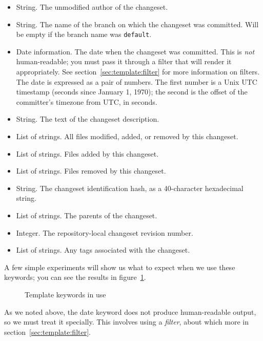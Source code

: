 \begin{itemize}
\item[\tplkword{author}] String.  The unmodified author of the changeset.
\item[\tplkword{branches}] String.  The name of the branch on which
  the changeset was committed.  Will be empty if the branch name was
  \texttt{default}.
\item[\tplkword{date}] Date information.  The date when the changeset
  was committed.  This is \emph{not} human-readable; you must pass it
  through a filter that will render it appropriately.  See
  section~\ref{sec:template:filter} for more information on filters.
  The date is expressed as a pair of numbers.  The first number is a
  Unix UTC timestamp (seconds since January 1, 1970); the second is
  the offset of the committer's timezone from UTC, in seconds.
\item[\tplkword{desc}] String.  The text of the changeset description.
\item[\tplkword{files}] List of strings.  All files modified, added, or
  removed by this changeset.
\item[\tplkword{file\_adds}] List of strings.  Files added by this
  changeset.
\item[\tplkword{file\_dels}] List of strings.  Files removed by this
  changeset.
\item[\tplkword{node}] String.  The changeset identification hash, as a
  40-character hexadecimal string.
\item[\tplkword{parents}] List of strings.  The parents of the
  changeset.
\item[\tplkword{rev}] Integer.  The repository-local changeset revision
  number.
\item[\tplkword{tags}] List of strings.  Any tags associated with the
  changeset.
\end{itemize}

A few simple experiments will show us what to expect when we use these
keywords; you can see the results in
figure~\ref{fig:template:keywords}.

\begin{figure}
  \caption{Template keywords in use}
  \label{fig:template:keywords}
\end{figure}

As we noted above, the date keyword does not produce human-readable
output, so we must treat it specially.  This involves using a
\emph{filter}, about which more in section~\ref{sec:template:filter}.

